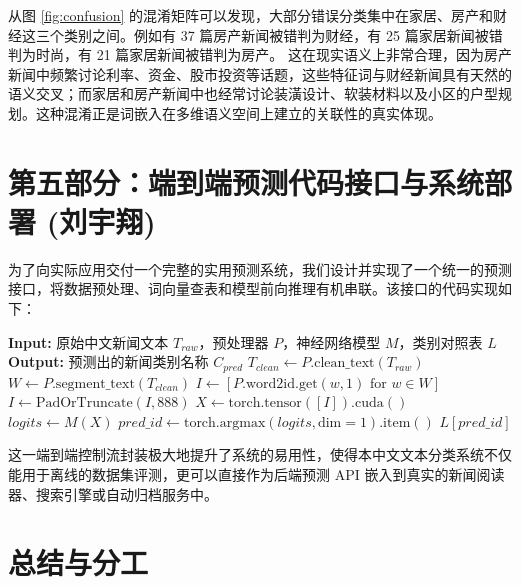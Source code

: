 \documentclass[UTF8,a4paper,11pt]{ctexart}
\begin{document}
从图 \ref{fig:confusion} 的混淆矩阵可以发现，大部分错误分类集中在家居、房产和财经这三个类别之间。例如有 37 篇房产新闻被错判为财经，有 25 篇家居新闻被错判为时尚，有 21 篇家居新闻被错判为房产。
这在现实语义上非常合理，因为房产新闻中频繁讨论利率、资金、股市投资等话题，这些特征词与财经新闻具有天然的语义交叉；而家居和房产新闻中也经常讨论装潢设计、软装材料以及小区的户型规划。这种混淆正是词嵌入在多维语义空间上建立的关联性的真实体现。

\section{第五部分：端到端预测代码接口与系统部署 (刘宇翔)}
为了向实际应用交付一个完整的实用预测系统，我们设计并实现了一个统一的预测接口，将数据预处理、词向量查表和模型前向推理有机串联。该接口的代码实现如下：

\begin{algorithm}[H]
\caption{中文文本分类系统端到端统一预测接口程序}
\label{alg:predict}
\begin{algorithmic}[1]
\State \textbf{Input:} 原始中文新闻文本 $T_{raw}$，预处理器 $P$，神经网络模型 $M$，类别对照表 $L$
\State \textbf{Output:} 预测出的新闻类别名称 $C_{pred}$
    \State $T_{clean} \gets P.\text{clean\_text}(T_{raw})$ 
    \State $W \gets P.\text{segment\_text}(T_{clean})$ 
    \State $I \gets [P.\text{word2id}.\text{get}(w, 1) \text{ for } w \in W]$ 
    \State $I \gets \text{PadOrTruncate}(I, 888)$ 
    \State $X \gets \text{torch.tensor}([I]).\text{cuda}()$ 
    \State $logits \gets M(X)$ 
    \State $pred\_id \gets \text{torch.argmax}(logits, \text{dim}=1).\text{item}()$
    \State \Return $L[pred\_id]$ 
\EndFunction
\end{algorithmic}
\end{algorithm}

这一端到端控制流封装极大地提升了系统的易用性，使得本中文文本分类系统不仅能用于离线的数据集评测，更可以直接作为后端预测 API 嵌入到真实的新闻阅读器、搜索引擎或自动归档服务中。

\section{总结与分工}
\end{document}
